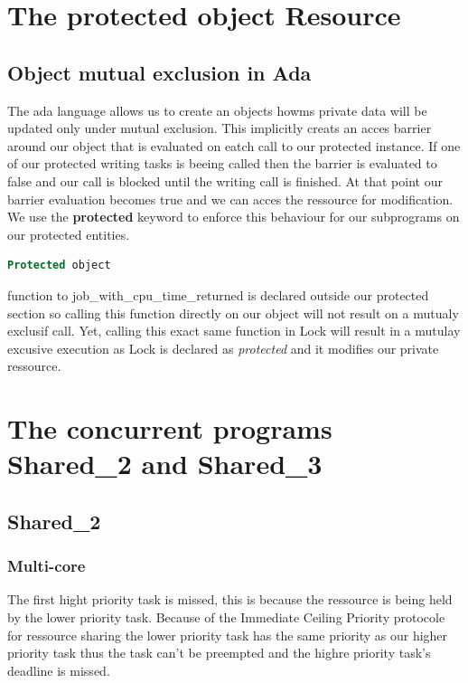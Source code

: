 \documentclass[10pt,a4paper]{article}
\begin{document}
\tableofcontents

\thispagestyle{empty}


\newpage
\section{The protected object Resource}
\subsection{Object mutual exclusion in Ada}
The ada language allows us to create an objects howms private data will be updated only under mutual exclusion. This implicitly creats an acces barrier around our object that is evaluated on eatch call to our protected instance. If one of our protected writing tasks is beeing called then the barrier is evaluated to false and our call is blocked until the writing call is finished. At that point our barrier evaluation becomes true and we can acces the ressource for modification.
\\We use the \textbf{protected} keyword to enforce this behaviour for our subprograms on our protected entities.
\begin{lstlisting}[language=ada,caption={chrt man page}]
Protected object
\end{lstlisting}
function to job\_with\_cpu\_time\_returned is declared outside our protected section so calling this function directly on our object will not result on a mutualy exclusif call.
Yet, calling this exact same function in Lock will result in a mutulay excusive execution as Lock is declared as \textit{protected} and it modifies our private ressource.

\section{The concurrent programs Shared\_2 and Shared\_3}
\subsection{Shared\_2}
\subsubsection{Multi-core}
The first hight priority task is missed, this is because the ressource is being held by the lower priority task. Because of the Immediate Ceiling Priority protocole for ressource sharing the lower priority task has the same priority as our higher priority task thus the task can't be preempted and the highre priority task's deadline is missed.
\end{document}
